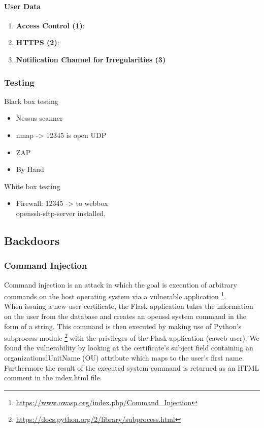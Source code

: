\documentclass[english]{article}
\begin{document}
\paragraph{User Data}
\begin{enumerate}[label=(\alph*)]
\item \textbf{Access Control (1)}:
\item \textbf{HTTPS (2)}:
\item \textbf{Notification Channel for Irregularities (3)}
\end{enumerate} 


\subsubsection{Testing}

Black box testing
\begin{itemize}
	
	\item Nessus scanner
	\item nmap -> 12345 is open UDP
	\item ZAP
	\item By Hand

\end{itemize}

White box testing

\begin{itemize}
	\item Firewall: 12345 -> to webbox\\ openssh-sftp-server installed,  
\end{itemize}



\subsection{Backdoors}


\subsubsection{Command Injection}
Command injection is an attack in which the goal is execution of arbitrary commands on the host operating system via a vulnerable application \footnote{\url{https://www.owasp.org/index.php/Command_Injection}}.\\
 When issuing a new user certificate, the Flask application takes the information on the user from the database and creates an openssl system command in the form of a string. This command is then executed by making use of Python's subprocess module \footnote{\url{https://docs.python.org/2/library/subprocess.html}} with the privileges of the Flask application (caweb user). 
 We found the vulnerability by looking at the certificate's subject field containing an organizationalUnitName (OU) attribute which maps to the user's first name. Furthermore the result of the executed system command is returned as an HTML comment in the index.html file.
 
\end{document}
